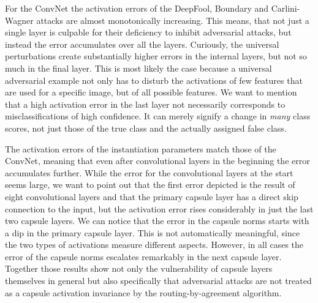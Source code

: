 For the ConvNet the activation errors of the DeepFool, Boundary and Carlini-Wagner attacks are almost monotonically increasing.
This means, that not just a single layer is culpable for their deficiency to inhibit adversarial attacks, but instead the error accumulates over all the layers.
Curiously, the universal perturbations create substantially higher errors in the internal layers, but not so much in the final layer.
This is most likely the case because a universal adversarial example not only has to disturb the activations of few features that are used for a specific image, but of all possible features. 
We want to mention that a high activation error in the last layer not necessarily corresponds to misclassifications of high confidence.
It can merely signify a change in \emph{many} class scores, not just those of the true class and the actually assigned false class.

The activation errors of the instantiation parameters match those of the ConvNet, meaning that even after convolutional layers in the beginning the error accumulates further.
While the error for the convolutional layers at the start seems large, we want to point out that the first error depicted is the result of eight convolutional layers and that the primary capsule layer has a direct skip connection to the input, but the activation error rises considerably in just the last two capsule layers.
We can notice that the error in the capsule norms starts with a dip in the primary capsule layer.
This is not automatically meaningful, since the two types of activations measure different aspects.
However, in all cases the error of the capsule norms escalates remarkably in the next capsule layer.
Together those results show not only the vulnerability of capsule layers themselves in general but also specifically that adversarial attacks are not treated as a capsule activation invariance by the routing-by-agreement algorithm.
